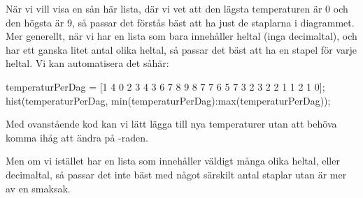 När vi vill visa en sån här lista, där vi vet att den lägsta temperaturen är 0 och den högsta är 9, så passar det förstås bäst att ha just de staplarna i diagrammet. Mer generellt, när vi har en lista som bara innehåller heltal (inga decimaltal), och har ett ganska litet antal olika heltal, så passar det bäst att ha en stapel för varje heltal. Vi kan automatisera det såhär:

\begin{matlab}[caption={Välja rätt antal staplar automatiskt},label={}]
temperaturPerDag = [1 4 0 2 3 4 3 6 7 8 9 8 7 7 6 5 7 3 2 3 2 2 1 1 2 1 0];
hist(temperaturPerDag, min(temperaturPerDag):max(temperaturPerDag));
\end{matlab}

Med ovanstående kod kan vi lätt lägga till nya temperaturer utan att behöva komma ihåg att ändra på -raden.

Men om vi istället har en lista som innehåller väldigt många olika heltal, eller decimaltal, så passar det inte bäst med något särskilt antal staplar utan är mer av en smaksak.


